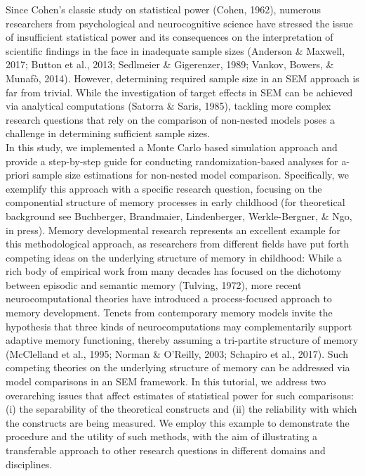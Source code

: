 \documentclass[
  man,floatsintext]{apa6}
\begin{document}
Since Cohen's classic study on statistical power (Cohen, 1962), numerous researchers from psychological and neurocognitive science have stressed the issue of insufficient statistical power and its consequences on the interpretation of scientific findings in the face in inadequate sample sizes (Anderson \& Maxwell, 2017; Button et al., 2013; Sedlmeier \& Gigerenzer, 1989; Vankov, Bowers, \& Munafò, 2014). However, determining required sample size in an SEM approach is far from trivial. While the investigation of target effects in SEM can be achieved via analytical computations (Satorra \& Saris, 1985), tackling more complex research questions that rely on the comparison of non-nested models poses a challenge in determining sufficient sample sizes.\\
In this study, we implemented a Monte Carlo based simulation approach and provide a step-by-step guide for conducting randomization-based analyses for a-priori sample size estimations for non-nested model comparison. Specifically, we exemplify this approach with a specific research question, focusing on the componential structure of memory processes in early childhood (for theoretical background see Buchberger, Brandmaier, Lindenberger, Werkle-Bergner, \& Ngo, in press). Memory developmental research represents an excellent example for this methodological approach, as researchers from different fields have put forth competing ideas on the underlying structure of memory in childhood: While a rich body of empirical work from many decades has focused on the dichotomy between episodic and semantic memory (Tulving, 1972), more recent neurocomputational theories have introduced a process-focused approach to memory development. Tenets from contemporary memory models invite the hypothesis that three kinds of neurocomputations may complementarily support adaptive memory functioning, thereby assuming a tri-partite structure of memory (McClelland et al., 1995; Norman \& O'Reilly, 2003; Schapiro et al., 2017). Such competing theories on the underlying structure of memory can be addressed via model comparisons in an SEM framework. In this tutorial, we address two overarching issues that affect estimates of statistical power for such comparisons: (i) the separability of the theoretical constructs and (ii) the reliability with which the constructs are being measured. We employ this example to demonstrate the procedure and the utility of such methods, with the aim of illustrating a transferable approach to other research questions in different domains and disciplines.
\end{document}
